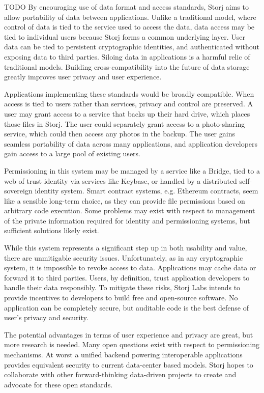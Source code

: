\documentclass[a4paper,10pt]{article}
\newcommand{\todo}[1]{{\color{red} TODO #1}}
\begin{document}
\todo{
By encouraging use of data format and access standards, Storj aims to allow
portability of data between applications. Unlike a traditional model, where
control of data is tied to the service used to access the data, data access may
be tied to individual users because Storj forms a common underlying layer. User
data can be tied to persistent cryptographic identities, and authenticated
without exposing data to third parties. Siloing data in applications is a
harmful relic of traditional models. Building cross-compatibility into the
future of data storage greatly improves user privacy and user experience.

Applications implementing these standards would be broadly compatible. When
access is tied to users rather than services, privacy and control are preserved.
A user may grant access to a service that backs up their hard drive, which
places those files in Storj. The user could separately grant access to a
photo-sharing service, which could then access any photos in the backup. The
user gains seamless portability of data across many applications, and
application developers gain access to a large pool of existing users.

Permissioning in this system may be managed by a service like a Bridge, tied to
a web of trust identity via services like Keybase, or handled by a distributed
self-sovereign identity system. Smart contract systems, e.g. Ethereum \cite{17}
contracts, seem like a sensible long-term choice, as they can provide file
permissions based on arbitrary code execution. Some problems may exist with
respect to management of the private information required for identity and
permissioning systems, but sufficient solutions likely exist.

While this system represents a significant step up in both usability and value,
there are unmitigable security issues. Unfortunately, as in any cryptographic
system, it is impossible to revoke access to data. Applications may cache data
or forward it to third parties. Users, by definition, trust application
developers to handle their data responsibly. To mitigate these risks, Storj Labs
intends to provide incentives to developers to build free and open-source
software. No application can be completely secure, but auditable code is the
best defense of user’s privacy and security.

The potential advantages in terms of user experience and privacy are great, but
more research is needed. Many open questions exist with respect to permissioning
mechanisms. At worst a unified backend powering interoperable applications
provides equivalent security to current data-center based models. Storj hopes to
collaborate with other forward-thinking data-driven projects to create and
advocate for these open standards.
}
\end{document}
